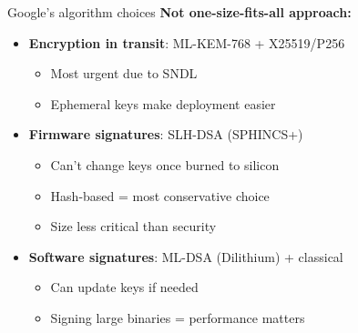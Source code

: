 \ifdefined\PRESENTATION\else\PassOptionsToClass{handout}{beamer}\fi\documentclass[aspectratio=169, lualatex]{beamer}
\begin{document}
\begin{frame}{Google's algorithm choices}
	\textbf{Not one-size-fits-all approach:}
	\begin{itemize}
		\item \textbf{Encryption in transit}: ML-KEM-768 + X25519/P256
		      \begin{itemize}
			      \item Most urgent due to SNDL
			      \item Ephemeral keys make deployment easier
		      \end{itemize}
		\item \textbf{Firmware signatures}: SLH-DSA (SPHINCS+)
		      \begin{itemize}
			      \item Can't change keys once burned to silicon
			      \item Hash-based = most conservative choice
			      \item Size less critical than security
		      \end{itemize}
		\item \textbf{Software signatures}: ML-DSA (Dilithium) + classical
		      \begin{itemize}
			      \item Can update keys if needed
			      \item Signing large binaries = performance matters
		      \end{itemize}
	\end{itemize}
\end{frame}
\end{document}

